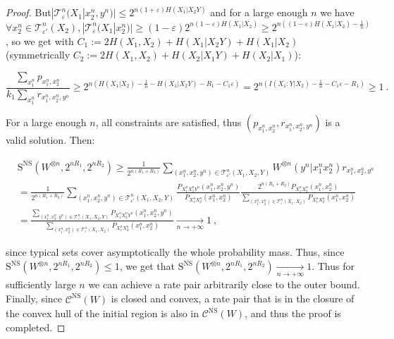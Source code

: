 \documentclass[11pt]{article}
\theoremstyle{definition}
\theoremstyle{remark}
\begin{document}
\begin{proof}
     But$|\mathcal{T}^n_{\varepsilon}(X_1|x_2^n,y^n)| \leq 2^{n(1+\varepsilon)H(X_1|X_2Y)}$ and for a large enough $n$ we have $\forall x_2^n \in \mathcal{T}^n_{\varepsilon'}(X_2), |\mathcal{T}^n_{\varepsilon}(X_1|x_2^n)| \geq (1-\varepsilon)2^{n(1-\varepsilon)H(X_1|X_2)} \geq 2^{n\left((1-\varepsilon)H(X_1|X_2)-\frac{1}{n}\right)}$, so we get with $C_1 := 2 H(X_1,X_2) + H(X_1|X_2Y) + H(X_1|X_2)$ (symmetrically $C_2 := 2 H(X_1,X_2) + H(X_2|X_1Y) + H(X_2|X_1)$):

     \[ \frac{\sum_{x_1^n} p_{x_1^n,x_2^n}}{k_1\sum_{x_1^n} r_{x_1^n,x_2^n,y^n}} \geq 2^{n\left(H(X_1|X_2) - \frac{1}{n} -H(X_1|X_2Y)-R_1-C_1\varepsilon\right)} = 2^{n\left(I(X_1: Y | X_2)-\frac{1}{n}-C_1\varepsilon-R_1\right)} \geq 1 \ .\]
     
    For a large enough $n$, all constraints are satisfied, thus $(p_{x_1^n,x_2^n},r_{x_1^n,x_2^n,y^n})$ is a valid solution. Then:

    \begin{equation}
      \begin{aligned}
        &\mathrm{S}^{\overline{\mathrm{NS}}}(W^{\otimes n},2^{nR_1},2^{nR_2}) \geq \frac{1}{2^{n(R_1+R_2)}} \sum_{(x_1^n,x_2^n,y^n) \in \mathcal{T}^n_{\varepsilon'}(X_1,X_2,Y)} W^{\otimes n}(y^n|x_1^nx_2^n)r_{x_1^n,x_2^n,y^n}\\
        &= \frac{1}{2^{n(R_1+R_2)}} \sum_{(x_1^n,x_2^n,y^n) \in \mathcal{T}^n_{\varepsilon'}(X_1,X_2,Y)} \frac{P_{X_1^nX_2^nY^n}(x_1^n,x_2^n,y^n)}{P_{X_1^nX_2^n}(x_1^n,x_2^n)}\frac{2^{n(R_1+R_2)}P_{X_1^nX_2^n}(x_1^n,x_2^n)}{\sum_{(x_1^n,x_2^n) \in \mathcal{T}^n_{\varepsilon}(X_1,X_2)}P_{X_1^nX_2^n}(x_1^n,x_2^n)}\\
        &= \frac{\sum_{(x_1^n,x_2^n,y^n) \in \mathcal{T}^n_{\varepsilon'}(X_1,X_2,Y)} P_{X_1^nX_2^nY^n}(x_1^n,x_2^n,y^n)}{\sum_{(x_1^n,x_2^n) \in \mathcal{T}^n_{\varepsilon}(X_1,X_2)}P_{X_1^nX_2^n}(x_1^n,x_2^n) } \underset{n \rightarrow +\infty}{\rightarrow} 1\ ,
      \end{aligned}
    \end{equation}

    since typical sets cover asymptotically the whole probability mass. Thus, since $\mathrm{S}^{\overline{\mathrm{NS}}}(W^{\otimes n},2^{nR_1},2^{nR_2}) \leq 1$, we get that $\mathrm{S}^{\overline{\mathrm{NS}}}(W^{\otimes n},2^{nR_1},2^{nR_2}) \underset{n \rightarrow +\infty}{\rightarrow} 1$. Thus for sufficiently large $n$ we can achieve a rate pair arbitrarily close to the outer bound. Finally, since $\mathcal{C}^{\overline{\mathrm{NS}}}(W)$ is closed and convex, a rate pair that is in the closure of the convex hull of the initial region is also in $\mathcal{C}^{\overline{\mathrm{NS}}}(W)$, and thus the proof is completed.
  \end{proof}
\end{document}
